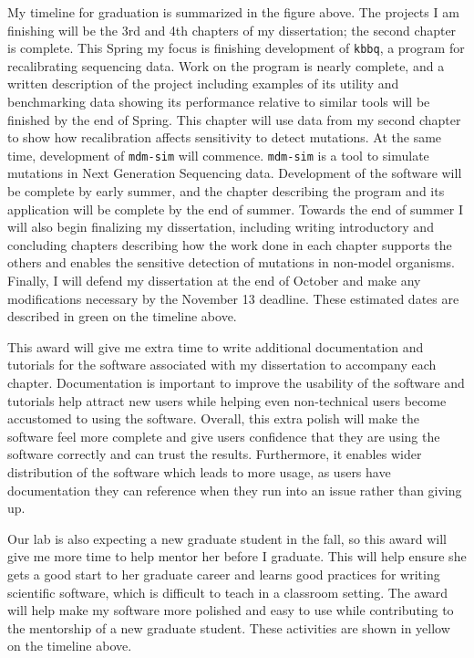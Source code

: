 \documentclass{article}
\begin{document}
My timeline for graduation is summarized in the figure above. The projects I am finishing will be the 3rd and 4th chapters of my dissertation; the second chapter is complete. This Spring my focus is finishing development of \texttt{kbbq}, a program for recalibrating sequencing data. Work on the program is nearly complete, and a written description of the project including examples of its utility and benchmarking data showing its performance relative to similar tools will be finished by the end of Spring. This chapter will use data from my second chapter to show how recalibration affects sensitivity to detect mutations. At the same time, development of \texttt{mdm-sim} will commence. \texttt{mdm-sim} is a tool to simulate mutations in Next Generation Sequencing data. Development of the software will be complete by early summer, and the chapter describing the program and its application will be complete by the end of summer. Towards the end of summer I will also begin finalizing my dissertation, including writing introductory and concluding chapters describing how the work done in each chapter supports the others and enables the sensitive detection of mutations in non-model organisms. Finally, I will defend my dissertation at the end of October and make any modifications necessary by the November 13 deadline. These estimated dates are described in green on the timeline above.

This award will give me extra time to write additional documentation and tutorials for the software associated with my dissertation to accompany each chapter. Documentation is important to improve the usability of the software and tutorials help attract new users while helping even non-technical users become accustomed to using the software. Overall, this extra polish will make the software feel more complete and give users confidence that they are using the software correctly and can trust the results. Furthermore, it enables wider distribution of the software which leads to more usage, as users have documentation they can reference when they run into an issue rather than giving up.

Our lab is also expecting a new graduate student in the fall, so this award will give me more time to help mentor her before I graduate. This will help ensure she gets a good start to her graduate career and learns good practices for writing scientific software, which is difficult to teach in a classroom setting. The award will help make my software more polished and easy to use while contributing to the mentorship of a new graduate student. These activities are shown in yellow on the timeline above.
\end{document}
